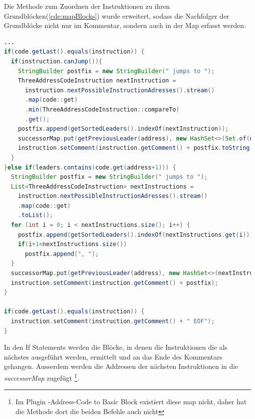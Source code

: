 Die Methode zum Zuordnen der Instruktionen zu ihren Grundblöcken(\cref{cde:mapBlocks})
wurde erweitert, sodass die Nachfolger der Grundblöcke nicht nur im Kommentar,
sondern auch in der Map erfasst werden:
\newpage
\begin{lstlisting}[language=Java, caption={Erweiterung der \textit{mapAddressesToItsBlock}-Methode}, label={cde:mapBlocks2}]
...
if(code.getLast().equals(instruction)) {
  if(instruction.canJump()){
    StringBuilder postfix = new StringBuilder(" jumps to ");
    ThreeAddressCodeInstruction nextInstruction = 
      instruction.nextPossibleInstructionAdresses().stream()
      .map(code::get)
      .min(ThreeAddressCodeInstruction::compareTo)
      .get();
    postfix.append(getSortedLeaders().indexOf(nextInstruction));
    successorMap.put(getPreviousLeader(address), new HashSet<>(Set.of(nextInstruction)));
    instruction.setComment(instruction.getComment() + postfix.toString());
  }
}else if(leaders.contains(code.get(address+1))) {
  StringBuilder postfix = new StringBuilder(" jumps to ");
  List<ThreeAddressCodeInstruction> nextInstructions = 
    instruction.nextPossibleInstructionAdresses().stream()
    .map(code::get)
    .toList();
  for (int i = 0; i < nextInstructions.size(); i++) {
    postfix.append(getSortedLeaders().indexOf(nextInstructions.get(i)));
    if(i+1<nextInstructions.size())
      postfix.append(", ");
  }
  successorMap.put(getPreviousLeader(address), new HashSet<>(nextInstructions));
  instruction.setComment(instruction.getComment() + postfix);
}

if(code.getLast().equals(instruction)) {
  instruction.setComment(instruction.getComment() + " EOF");
}
\end{lstlisting}
In den If Statements werden die Blöcke, in denen die Instruktionen die als nächstes
ausgeführt werden, ermittelt und an das Ende des Kommentars gehangen. Ausserdem
werden die Addressen der nächsten Instruktionen in die \textit{successorMap}
zugefügt
\footnote{Im Plugin -Address-Code to Basic Block \grqq existiert diese map nicht, 
daher hat die Methode dort die beiden Befehle auch nicht}.



